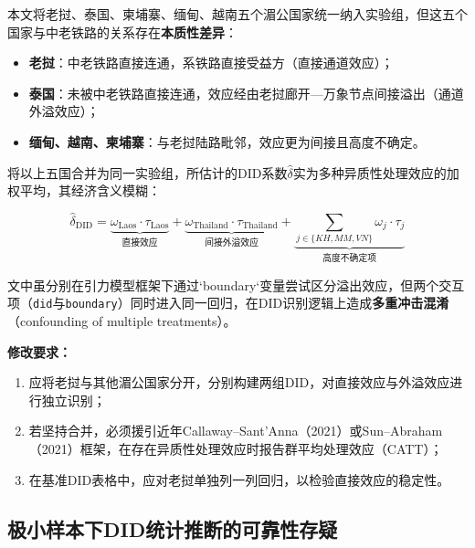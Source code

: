 \documentclass[12pt, a4paper]{article}
\begin{document}
\begin{criticalbox}

本文将老挝、泰国、柬埔寨、缅甸、越南五个湄公国家统一纳入实验组，但这五个国家与中老铁路的关系存在\textbf{本质性差异}：

\begin{itemize}
  \item \textbf{老挝}：中老铁路直接连通，系铁路直接受益方（直接通道效应）；
  \item \textbf{泰国}：未被中老铁路直接连通，效应经由老挝廊开—万象节点间接溢出（通道外溢效应）；
  \item \textbf{缅甸、越南、柬埔寨}：与老挝陆路毗邻，效应更为间接且高度不确定。
\end{itemize}

将以上五国合并为同一实验组，所估计的DID系数$\hat{\delta}$实为多种异质性处理效应的加权平均，其经济含义模糊：

\begin{equation}
  \hat{\delta}_{\text{DID}} = \underbrace{\omega_{\text{Laos}} \cdot \tau_{\text{Laos}}}_{\text{直接效应}} + \underbrace{\omega_{\text{Thailand}} \cdot \tau_{\text{Thailand}}}_{\text{间接外溢效应}} + \underbrace{\sum_{j \in \{KH,MM,VN\}} \omega_j \cdot \tau_j}_{\text{高度不确定项}}
  \label{eq:weighted_ate}
\end{equation}

文中虽分别在引力模型框架下通过`boundary`变量尝试区分溢出效应，但两个交互项（\texttt{did}与\texttt{boundary}）同时进入同一回归，在DID识别逻辑上造成\textbf{多重冲击混淆}（confounding of multiple treatments）。

\textbf{修改要求：}
\begin{enumerate}[label=(\alph*)]
  \item 应将老挝与其他湄公国家分开，分别构建两组DID，对直接效应与外溢效应进行独立识别；
  \item 若坚持合并，必须援引近年Callaway–Sant'Anna（2021）或Sun–Abraham（2021）框架，在存在异质性处理效应时报告群平均处理效应（CATT）；
  \item 在基准DID表格中，应对老挝单独列一列回归，以检验直接效应的稳定性。
\end{enumerate}
\end{criticalbox}

\subsection{极小样本下DID统计推断的可靠性存疑}
\label{sec:small_sample}
\end{document}
